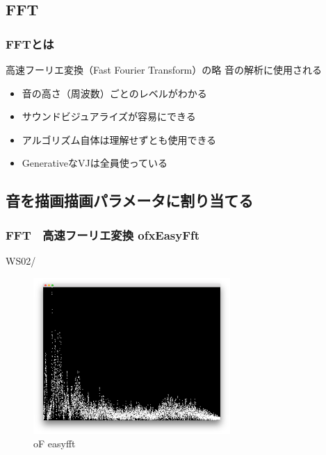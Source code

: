 \documentclass[10pt, dvipdfmx]{beamer}
\begin{document}
    \subsection{FFT}
        \begin{frame}
            \frametitle{FFTとは}
            \begin{block}{高速フーリエ変換（Fast Fourier Transform）の略 音の解析に使用される}
                \begin{itemize}
                    \item 音の高さ（周波数）ごとのレベルがわかる
                    \item サウンドビジュアライズが容易にできる
                    \item アルゴリズム自体は理解せずとも使用できる
                    \item GenerativeなVJは全員使っている
                \end{itemize}
            \end{block}
        \end{frame}

    \subsection{音を描画描画パラメータに割り当てる}
        \begin{frame}
            \frametitle{FFT　高速フーリエ変換 ofxEasyFft}
                \tiny
                WS02/
                \begin{figure}[htb]
                    \includegraphics[width=75mm]{images/fft-1.png}
                    \caption{oF easyfft}
                    \label{fig:fft-1}
                \end{figure}
        \end{frame}
\end{document}
